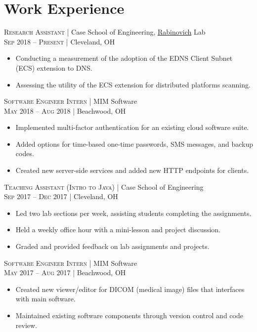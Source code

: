 \documentclass[a4paper,11pt]{article}
\begin{document}
\section{Work Experience}
\textsc{Research Assistant} | Case School of Engineering, \href{http://engr.case.edu/rabinovich_michael/}{Rabinovich} Lab \\
\textsc{Sep 2018 – Present} | Cleveland, OH
\begin{itemize}
	\item Conducting a measurement of the adoption of the EDNS Client Subnet (ECS) extension to DNS.
	\item Assessing the utility of the ECS extension for distributed platforms scanning.
\end{itemize}
\vskip 3mm
\textsc{Software Engineer Intern} | MIM Software \\
\textsc{May 2018 – Aug 2018} | Beachwood, OH
\begin{itemize}
	\item Implemented multi-factor authentication for an existing cloud software suite.
	\item Added options for time-based one-time passwords, SMS messages, and backup codes.
	\item Created new server-side services and added new HTTP endpoints for clients.
\end{itemize}
\vskip 3mm
\textsc{Teaching Assistant (Intro to Java)} | Case School of Engineering \\
 \textsc{Sep 2017 – Dec 2017} | Cleveland, OH
 \begin{itemize}
	 \item	Led two lab sections per week, assisting students completing the assignments.
	 \item Held a weekly office hour with a mini-lesson and project discussion.
	 \item Graded and provided feedback on lab assignments and projects.
 \end{itemize}
 \vskip 3mm
 \textsc{Software Engineer Intern} | MIM Software \\
 \textsc{May 2017 – Aug 2017} | Beachwood, OH
 \begin{itemize}
	\item Created new viewer/editor for DICOM (medical image) files that interfaces with main software.
	\item Maintained existing software components through version control and code review.
 \end{itemize}
\end{document}
